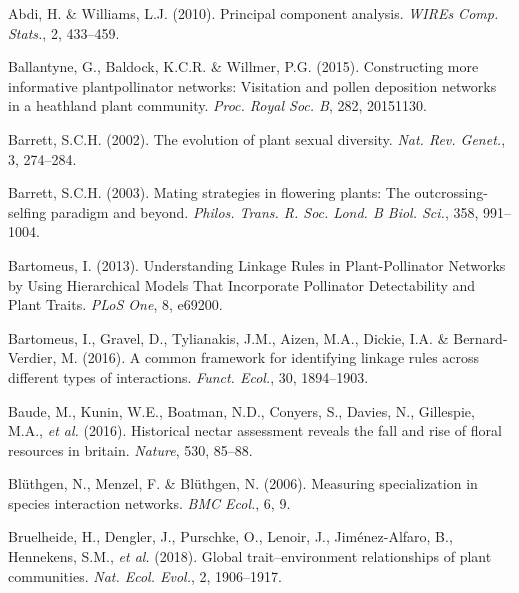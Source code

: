 \documentclass[
  12pt,
  a4paper,
]{article}
\newlength{\cslhangindent}
\newlength{\cslentryspacingunit} %
\newenvironment{CSLReferences}[2] %
 {%
  \setlength{\parindent}{0pt}
  \ifodd #1
  \let\oldpar\par
  \def\par{\hangindent=\cslhangindent\oldpar}
  \fi
  \setlength{\parskip}{#2\cslentryspacingunit}
 }%
 {}
\begin{document}
\hypertarget{refs}{}
\begin{CSLReferences}{1}{0}
\leavevmode{}%
Abdi, H. \& Williams, L.J. (2010). Principal component analysis. \emph{WIREs Comp. Stats.}, 2, 433--459.

\leavevmode{}%
Ballantyne, G., Baldock, K.C.R. \& Willmer, P.G. (2015). Constructing more informative plant\textendash pollinator networks: Visitation and pollen deposition networks in a heathland plant community. \emph{Proc. Royal Soc. B}, 282, 20151130.

\leavevmode{}%
Barrett, S.C.H. (2002). The evolution of plant sexual diversity. \emph{Nat. Rev. Genet.}, 3, 274--284.

\leavevmode{}%
Barrett, S.C.H. (2003). Mating strategies in flowering plants: The outcrossing-selfing paradigm and beyond. \emph{Philos. Trans. R. Soc. Lond. B Biol. Sci.}, 358, 991--1004.

\leavevmode{}%
Bartomeus, I. (2013). Understanding {Linkage Rules} in {Plant}-{Pollinator Networks} by {Using Hierarchical Models That Incorporate Pollinator Detectability} and {Plant Traits}. \emph{PLoS One}, 8, e69200.

\leavevmode{}%
Bartomeus, I., Gravel, D., Tylianakis, J.M., Aizen, M.A., Dickie, I.A. \& Bernard-Verdier, M. (2016). A common framework for identifying linkage rules across different types of interactions. \emph{Funct. Ecol.}, 30, 1894--1903.

\leavevmode{}%
Baude, M., Kunin, W.E., Boatman, N.D., Conyers, S., Davies, N., Gillespie, M.A., \emph{et al.} (2016). Historical nectar assessment reveals the fall and rise of floral resources in britain. \emph{Nature}, 530, 85--88.

\leavevmode{}%
Blüthgen, N., Menzel, F. \& Blüthgen, N. (2006). Measuring specialization in species interaction networks. \emph{BMC Ecol.}, 6, 9.

\leavevmode{}%
Bruelheide, H., Dengler, J., Purschke, O., Lenoir, J., Jiménez-Alfaro, B., Hennekens, S.M., \emph{et al.} (2018). Global trait--environment relationships of plant communities. \emph{Nat. Ecol. Evol.}, 2, 1906--1917.


\end{CSLReferences}
\end{document}
